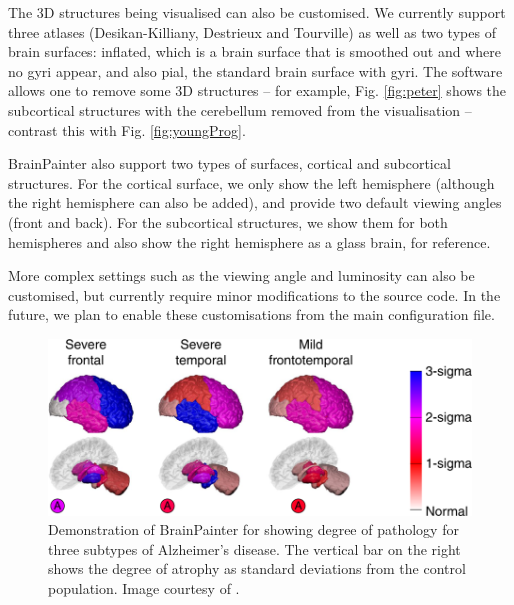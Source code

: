 \documentclass{llncs}
\begin{document}
The 3D structures being visualised can also be customised. We currently support three atlases (Desikan-Killiany, Destrieux and Tourville) as well as two types of brain surfaces: inflated, which is a brain surface that is smoothed out and where no gyri appear, and also pial, the standard brain surface with gyri. The software allows one to remove some 3D structures -- for example, Fig. \ref{fig:peter} shows the subcortical structures with the cerebellum removed from the visualisation -- contrast this with Fig. \ref{fig:youngProg}. 
 
BrainPainter also support two types of surfaces, cortical and subcortical structures. For the cortical surface, we only show the left hemisphere (although the right hemisphere can also be added), and provide two default viewing angles (front and back). For the subcortical structures, we show them for both hemispheres and also show the right hemisphere as a glass brain, for reference.

More complex settings such as the viewing angle and luminosity can also be customised, but currently require minor modifications to the source code. In the future, we plan to enable these customisations from the main configuration file.




\begin{figure}
\centering
 \includegraphics[width=1\textwidth]{images/young_3brains.png}
 \caption{Demonstration of BrainPainter for showing degree of pathology for three subtypes of Alzheimer's disease. The vertical bar on the right shows the degree of atrophy as standard deviations from the control population. Image courtesy of \cite{young2018uncovering}.}
 \label{fig:youngDegree}
\end{figure}
\end{document}
